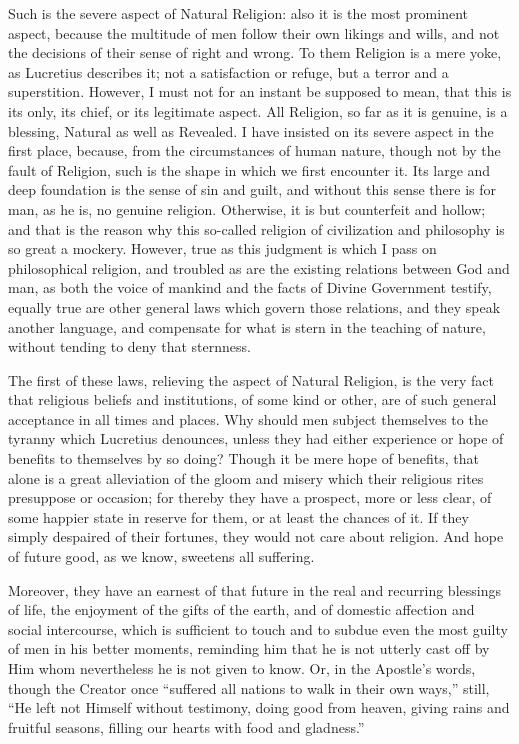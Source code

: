 Such is the severe aspect of Natural Religion: also it is the most
prominent aspect, because the multitude of men follow their own
likings and wills, and not the decisions of their sense of right and
wrong. To them Religion is a mere yoke, as Lucretius describes it; not
a satisfaction or refuge, but a terror and a superstition. However, I
must not for an instant be supposed to mean, that this is its only,
its chief, or its legitimate aspect. All Religion, so far as it is
genuine, is a blessing, Natural as well as Revealed. I have insisted
on its severe aspect in the first place, because, from the
circumstances of human nature, though not by the fault of Religion,
such is the shape in which we first encounter it. Its large and deep
foundation is the sense of sin and guilt, and without this sense there
is for man, as he is, no genuine religion. Otherwise, it is but
counterfeit and hollow; and that is the reason why this so-called
religion of civilization and philosophy is so great a mockery.
However, true as this judgment is which I pass on philosophical
religion, and troubled as are the existing relations between God and
man, as both the voice of mankind and the facts of Divine Government
testify, equally true are other general laws which govern those
relations, and they speak another language, and compensate for what is
stern in the teaching of nature, without tending to deny that
sternness.

The first of these laws, relieving the aspect of Natural Religion,
is the very fact that religious beliefs and institutions, of some kind
or other, are of such general acceptance in all times and places. Why
should men subject themselves to the tyranny which Lucretius
denounces, unless they had either experience or hope of benefits to
themselves by so doing? Though it be mere hope of benefits, that alone
is a great alleviation of the gloom and misery which their religious
rites presuppose or occasion; for thereby they have a prospect, more
or less clear, of some happier state in reserve for them, or at least
the chances of it. If they simply despaired of their fortunes, they
would not care about religion. And hope of future good, as we know,
sweetens all suffering.

Moreover, they have an earnest of that future in the real and
recurring blessings of life, the enjoyment of the gifts of the earth,
and of domestic affection and social intercourse, which is sufficient
to touch and to subdue even the most guilty of men in his better
moments, reminding him that he is not utterly cast off by Him whom
nevertheless he is not given to know. Or, in the Apostle's words,
though the Creator once ``suffered all nations to walk in their
own ways,'' still, ``He left not Himself without testimony,
doing good from heaven, giving rains and fruitful seasons, filling our
hearts with food and gladness.''

